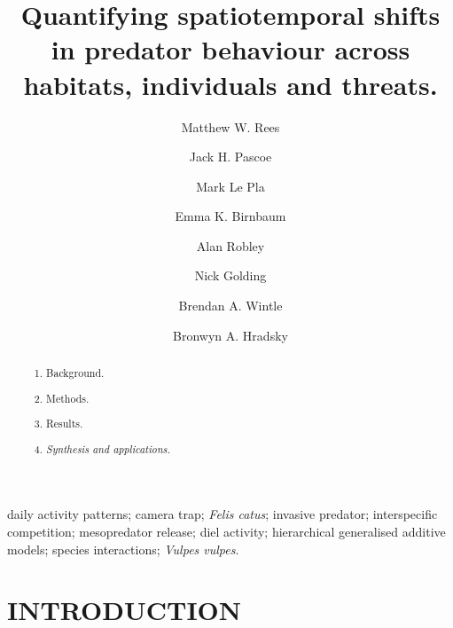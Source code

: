 \documentclass[]{elsarticle} %
\begin{document}
\begin{frontmatter}

  \title{Quantifying spatiotemporal shifts in predator behaviour across habitats, individuals and threats.}
    \author[UOM]{Matthew W. Rees}
    \author[CEC]{Jack H. Pascoe}
  
    \author[CEC]{Mark Le Pla}
  
    \author[CEC]{Emma K. Birnbaum}
  
    \author[ARI]{Alan Robley}
  
    \author[CU,TKI]{Nick Golding}
  
    \author[UOM]{Brendan A. Wintle}
  
    \author[UOM]{Bronwyn A. Hradsky}
  
      \address[UOM]{Quantitative \& Applied Ecology Group, School of Ecosystem and Forest Science, The University of Melbourne, Parkville, VIC, Australia}
    \address[CEC]{Conservation Ecology Centre, Otway Lighthouse Rd, Cape Otway, VIC, Australia}
    \address[ARI]{Department of Environment, Land, Water and Planning, Arthur Rylah Institute for Environmental Research, Heidelberg, Australia}
    \address[CU]{Curtin University, Bentley, WA, Australia}
    \address[TKI]{Telethon Kids Institute, Perth Children's Hospital, Nedlands, WA, Australia}
  
  \begin{abstract}
  \begin{enumerate}
  \def\labelenumi{\arabic{enumi}.}
  \item
    Background.
  \item
    Methods.
  \item
    Results.
  \item
    \emph{Synthesis and applications.}
  \end{enumerate}
  \end{abstract}
   \begin{keyword} daily activity patterns; camera trap; \emph{Felis catus}; invasive predator; interspecific competition; mesopredator release; diel activity; hierarchical generalised additive models; species interactions; \emph{Vulpes vulpes}.\end{keyword}
 \end{frontmatter}

\parskip=12pt

\newpage

\hypertarget{introduction}{%
\section{INTRODUCTION}\label{introduction}}
\end{document}
